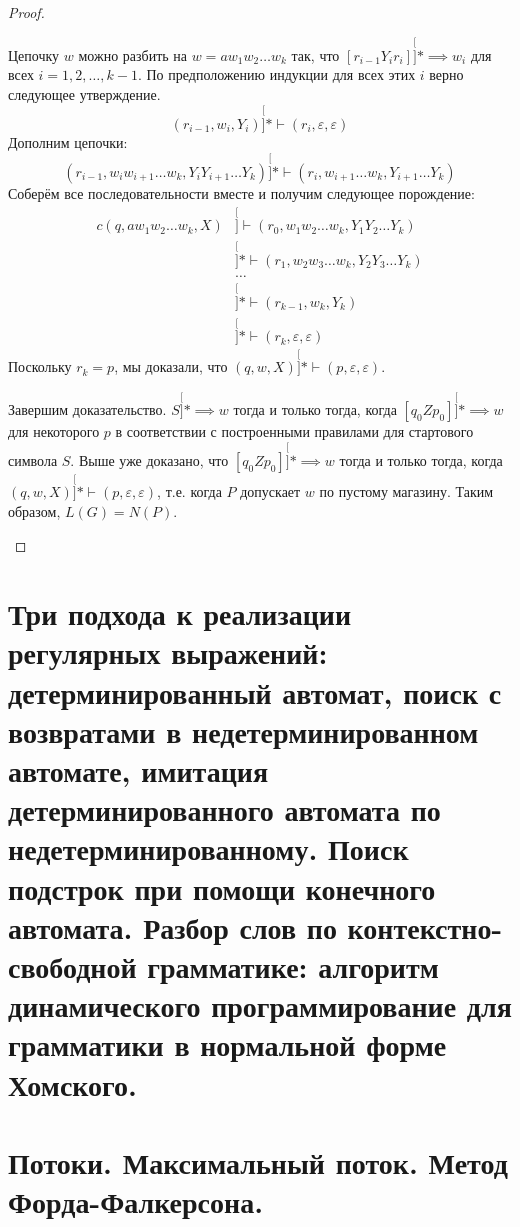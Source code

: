 \documentclass[a4paper,12pt]{article}
\begin{document}
\begin{proof}
\begin{description}
\begin{description}
			Цепочку $w$ можно разбить на $w = a w_1 w_2 \ldots w_k$ так, что $[r_{i - 1} Y_i r_{i}] \stackrel[]{*}{\implies} w_i$ для всех $i = 1, 2, \ldots, k - 1$. По предположению индукции для всех этих $i$ верно следующее утверждение.
			\[(r_{i - 1}, w_{i}, Y_{i}) \stackrel[]{*}{\vdash} (r_i, \varepsilon, \varepsilon)\]
			Дополним цепочки:
			\[(r_{i - 1}, w_{i} w_{i + 1} \ldots w_{k}, Y_{i}Y_{i + 1} \ldots Y_{k}) \stackrel[]{*}{\vdash} (r_i, w_{i + 1} \ldots w_{k}, Y_{i + 1} \ldots Y_{k})\]
			Соберём все последовательности вместе и получим следующее порождение:
			\[\begin{aligned}{c}
			(q, a w_1 w_2 \ldots w_k, X) & \stackrel[]{}{\vdash} (r_0, w_1 w_2 \ldots w_k, Y_{1}Y_{2} \ldots Y_{k}) \\
			& \stackrel[]{*}{\vdash} (r_1, w_2 w_3 \ldots w_k, Y_{2}Y_{3} \ldots Y_{k}) \\
			& \ldots \\
			& \stackrel[]{*}{\vdash} (r_{k - 1}, w_k, Y_{k}) \\ 
			& \stackrel[]{*}{\vdash} (r_k, \varepsilon, \varepsilon)
			\end{aligned}\]
			Поскольку $r_k = p$, мы доказали, что $(q, w, X) \stackrel[]{*}{\vdash} (p, \varepsilon, \varepsilon)$.
		\end{description}
		
		Завершим доказательство. $S \stackrel[]{*}{\implies} w$ тогда и только тогда, когда $[q_0 Z p_0] \stackrel[]{*}{\implies} w$ для некоторого $p$ в соответствии с построенными правилами для стартового символа $S$. Выше уже доказано, что $[q_0 Z p_0] \stackrel[]{*}{\implies} w$ тогда и только тогда, когда $(q, w, X) \stackrel[]{*}{\vdash} (p, \varepsilon, \varepsilon)$, т.е. когда $P$ допускает $w$ по пустому магазину. Таким образом, $L(G) = N(P)$.
	\end{description}
\end{proof}

\newpage
\section{Три подхода к реализации регулярных выражений: детерминированный автомат, поиск с возвратами в недетерминированном автомате, имитация детерминированного автомата по недетерминированному. Поиск подстрок при помощи конечного автомата. Разбор слов по контекстно-свободной грамматике: алгоритм динамического программирование для грамматики в нормальной форме Хомского.}


\newpage
\section{Потоки. Максимальный поток. Метод Форда-Фалкерсона.}
\end{document}
